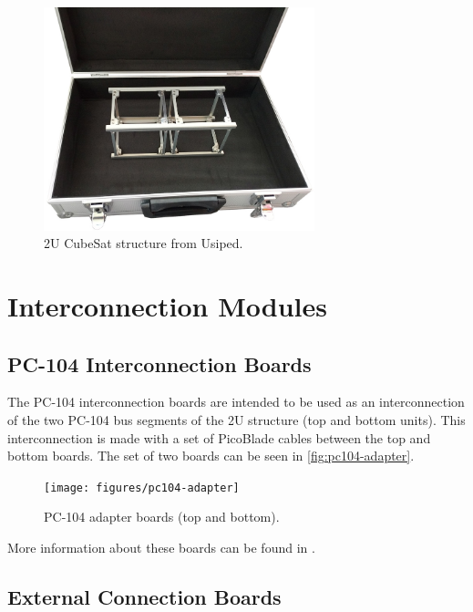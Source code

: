 \begin{figure}[!ht]
    \begin{center}
        \includegraphics[width=0.7\textwidth]{figures/usiped-2u-structure.jpg}
        \caption{2U CubeSat structure from Usiped.}
        \label{fig:usiped-structure}
    \end{center}
\end{figure}

\section{Interconnection Modules}

\subsection{PC-104 Interconnection Boards}

The PC-104 interconnection boards are intended to be used as an interconnection of the two PC-104 bus segments of the 2U structure (top and bottom units). This interconnection is made with a set of PicoBlade cables between the top and bottom boards. The set of two boards can be seen in \autoref{fig:pc104-adapter}.

\begin{figure}[!ht]
    \begin{center}
        \texttt{[image: figures/pc104-adapter]}
        \caption{PC-104 adapter boards (top and bottom).}
        \label{fig:pc104-adapter}
    \end{center}
\end{figure}

More information about these boards can be found in \cite{pc104-boards}.

\subsection{External Connection Boards}

